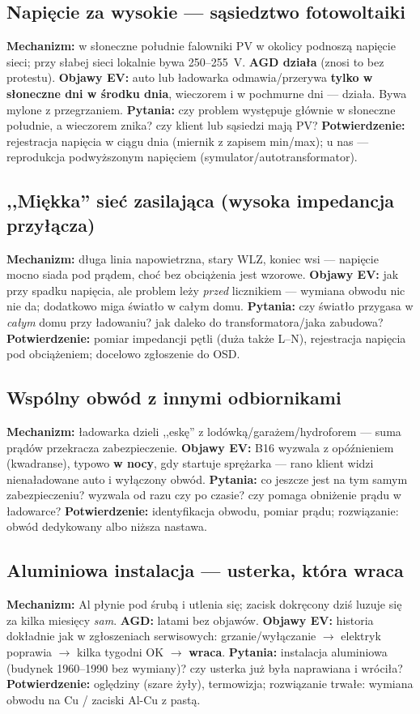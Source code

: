 \documentclass[11pt,a4paper]{article}
\begin{document}
\subsection{Napięcie za wysokie --- sąsiedztwo fotowoltaiki}
\textbf{Mechanizm:} w słoneczne południe falowniki PV w okolicy podnoszą napięcie sieci; przy
słabej sieci lokalnie bywa 250--255~V. \textbf{AGD działa} (znosi to bez protestu).
\textbf{Objawy EV:} auto lub ładowarka odmawia/przerywa \textbf{tylko w słoneczne dni w środku
dnia}, wieczorem i w pochmurne dni --- działa. Bywa mylone z przegrzaniem. \textbf{Pytania:} czy
problem występuje głównie w słoneczne południe, a wieczorem znika? czy klient lub sąsiedzi mają
PV? \textbf{Potwierdzenie:} rejestracja napięcia w ciągu dnia (miernik z zapisem min/max);
u nas --- reprodukcja podwyższonym napięciem (symulator/autotransformator).

\subsection{,,Miękka'' sieć zasilająca (wysoka impedancja przyłącza)}
\textbf{Mechanizm:} długa linia napowietrzna, stary WLZ, koniec wsi --- napięcie mocno siada pod
prądem, choć bez obciążenia jest wzorowe. \textbf{Objawy EV:} jak przy spadku napięcia, ale problem
leży \emph{przed} licznikiem --- wymiana obwodu nic nie da; dodatkowo miga światło w całym domu.
\textbf{Pytania:} czy światło przygasa w \emph{całym} domu przy ładowaniu? jak daleko do
transformatora/jaka zabudowa? \textbf{Potwierdzenie:} pomiar impedancji pętli (duża także L--N),
rejestracja napięcia pod obciążeniem; docelowo zgłoszenie do OSD.

\subsection{Wspólny obwód z innymi odbiornikami}
\textbf{Mechanizm:} ładowarka dzieli ,,eskę'' z lodówką/garażem/hydroforem --- suma prądów
przekracza zabezpieczenie. \textbf{Objawy EV:} B16 wyzwala z opóźnieniem (kwadranse), typowo
\textbf{w nocy}, gdy startuje sprężarka --- rano klient widzi nienaładowane auto i wyłączony obwód.
\textbf{Pytania:} co jeszcze jest na tym samym zabezpieczeniu? wyzwala od razu czy po czasie? czy
pomaga obniżenie prądu w ładowarce? \textbf{Potwierdzenie:} identyfikacja obwodu, pomiar prądu;
rozwiązanie: obwód dedykowany albo niższa nastawa.

\subsection{Aluminiowa instalacja --- usterka, która wraca}
\textbf{Mechanizm:} Al płynie pod śrubą i utlenia się; zacisk dokręcony dziś luzuje się za kilka
miesięcy \emph{sam}. \textbf{AGD:} latami bez objawów. \textbf{Objawy EV:} historia dokładnie jak
w zgłoszeniach serwisowych: grzanie/wyłączanie $\to$ elektryk poprawia $\to$ kilka tygodni OK $\to$
\textbf{wraca}. \textbf{Pytania:} instalacja aluminiowa (budynek 1960--1990 bez wymiany)? czy
usterka już była naprawiana i wróciła? \textbf{Potwierdzenie:} oględziny (szare żyły), termowizja;
rozwiązanie trwałe: wymiana obwodu na Cu / zaciski Al-Cu z pastą.
\end{document}
